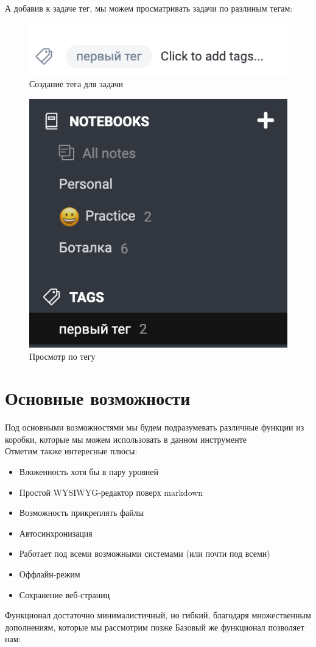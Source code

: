 \documentclass[12pt, a4paper]{article}
\begin{document}
    А добавив к задаче тег, мы можем просматривать задачи по разлиным тегам:
    \begin{multicols}{2}
        \begin{figure}[H]
            \centering
            \includegraphics[width=0.75\linewidth]{src/7.png}
            \caption{Создание тега для задачи}
        \end{figure}
    \columnbreak
        \begin{figure}[H]
            \centering
            \includegraphics[width=0.75\linewidth]{src/8.png}
            \caption{Просмотр по тегу}
        \end{figure}
    \end{multicols}

    \newpage
    \section{Основные возможности}

    Под основными возможностями мы будем подразумевать различные функции из коробки,
    которые мы можем использовать в данном инструменте\\
    Отметим также интересные плюсы:
    \begin{itemize}
        \item Вложенность хотя бы в пару уровней
        \item Простой WYSIWYG-редактор поверх markdown
        \item Возможность прикреплять файлы
        \item Автосинхронизация
        \item Работает под всеми возможными системами (или почти под всеми)
        \item Оффлайн-режим
        \item Сохранение веб-страниц
    \end{itemize}
    Функционал достаточно минималистичный, но гибкий, благодаря множественным дополнениям, которые мы рассмотрим позже
    Базовый же функционал позволяет нам:
    
\end{document}
